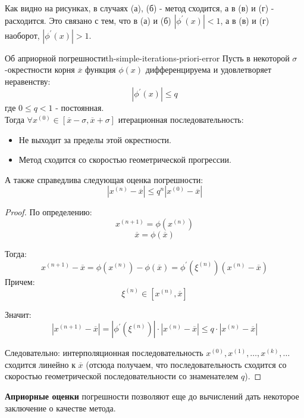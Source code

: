 \documentclass[14pt]{extarticle}
\begin{document}
        Как видно на рисунках, в случаях (а), (б) - метод сходится, а в (в) и (г) - расходится. Это связано с тем, что в (а) и (б) $|\phi^{'}(x)| < 1$, а в (в) и (г) наоборот, $|\phi^{'}(x)| > 1$.

        \begin{theorem}{Об априорной погрешности}{th-simple-iterations-priori-error}
            Пусть в некоторой $\sigma$-окрестности корня $\overline{x}$ функция $\phi(x)$ дифференцируема и удовлетворяет неравенству:
            $$|\phi^{'}(x)| \leq q$$
            где $0 \leq q < 1$ - постоянная.\\

            Тогда $\forall x^{(0)} \in [\overline{x} - \sigma, \overline{x} + \sigma]$ итерационная последовательность:
            \begin{itemize}
                \item Не выходит за пределы этой окрестности.
                \item Метод сходится со скоростью геометрической прогрессии. 
            \end{itemize}
            А также справедлива следующая оценка погрешности:
            $$|x^{(n)} - \overline{x}| \leq q^{n}|x^{(0)} - \overline{x}|$$

            \begin{proof}
                По определению:
                $$x^{(n + 1)} = \phi(x^{(n)})$$
                $$\overline{x} = \phi(\overline{x})$$

                Тогда:
                $$x^{(n + 1)} - \overline{x} = \phi(x^{(n)}) - \phi(\overline{x}) = \phi^{'}(\xi^{(n)})(x^{(n)} - \overline{x})$$
                Причем:
                $$\xi^{(n)} \in [x^{(n)}, \overline{x}]$$

                Значит:
                $$|x^{(n+1)} - \overline{x}| = |\phi^{'}(\xi^{(n)})| \cdot |x^{(n)} - \overline{x}| \leq q \cdot |x^{(n)} - \overline{x}|$$
            
                Следовательно: интерполяционная последовательность $x^{(0)}, x^{(1)}, \ldots, x^{(k)}, \ldots$ сходится линейно к $\overline{x}$ (отсюда получаем, что последовательность сходится со скоростью геометрической последовательности со знаменателем $q$).
            \end{proof}

        \end{theorem}

        \textbf{Априорные оценки} погрешности позволяют еще до вычислений дать некоторое заключение о качестве метода.
\end{document}
